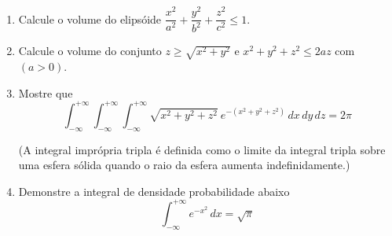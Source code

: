 \documentclass[11pt,a4paper]{article}
\newcommand{\integral}{\displaystyle\int}
\begin{document}
\begin{enumerate}
\begin{enumerate}
\end{enumerate}

\item Calcule o volume do elipsóide $\dfrac{x^2}{a^2} + \dfrac{y^2}{b^2} + \dfrac{z^2}{c^2} \leq 1$.

\item Calcule o volume do conjunto $z \geq \sqrt{x^2 + y^2}$ e $x^2 + y^2 + z^2 \leq 2az$ com $(a > 0)$.

\item Mostre que
$$\integral_{-\infty}^{+\infty} \integral_{-\infty}^{+\infty} \integral_{-\infty}^{+\infty} \sqrt{x^2 + y^2 + z^2} \ e^{-(x^2 + y^2 + z^2)} \,dx\,dy\,dz = 2 \pi$$

(A integral imprópria tripla é definida como o limite da integral tripla sobre uma esfera sólida quando o raio da esfera aumenta indefinidamente.)

\item Demonstre a integral de densidade probabilidade abaixo
$$\integral_{-\infty}^{+\infty} e^{-x^2}\,dx = \sqrt{\pi}$$ 
\end{enumerate}
		
	
\end{document}
